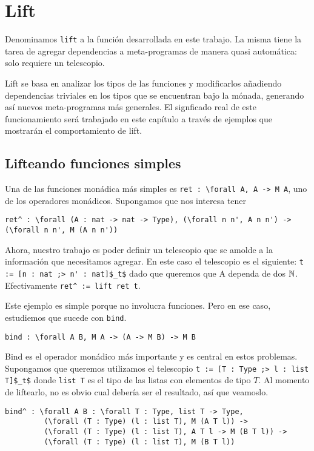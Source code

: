 \section{Lift}

Denominamos \lstinline{lift} a la función desarrollada en este trabajo.
La misma tiene la tarea de agregar dependencias a meta-programas de manera quasi automática: solo requiere un telescopio.

Lift se basa en analizar los tipos de las funciones y modificarlos añadiendo dependencias triviales en los tipos que se encuentran bajo la mónada, generando así nuevos meta-programas más generales.
El signficado real de este funcionamiento será trabajado en este capítulo a través de ejemplos que mostrarán el comportamiento de lift.

\subsection[]{Lifteando funciones simples}

Una de las funciones monádica más simples es \lstinline{ret : \forall A, A -> M A}, uno de los operadores monádicos.
Supongamos que nos interesa tener
\begin{lstlisting}
ret^ : \forall (A : nat -> nat -> Type), (\forall n n', A n n') -> (\forall n n', M (A n n'))
\end{lstlisting}

Ahora, nuestro trabajo es poder definir un telescopio que se amolde a la información que necesitamos agregar.
En este caso el telescopio es el siguiente: \lstinline{t := [n : nat ;> n' : nat]$_t$} dado que queremos que \lstinline{}{A} dependa de dos $\mathbb{N}$. Efectivamente \lstinline{ret^ := lift ret t}.

Este ejemplo es simple porque no involucra funciones. Pero en ese caso, estudiemos que sucede con \lstinline{bind}.
\begin{lstlisting}
bind : \forall A B, M A -> (A -> M B) -> M B
\end{lstlisting}

Bind es el operador monádico más importante y es central en estos problemas.
Supongamos que queremos utilizamos el telescopio \lstinline{t := [T : Type ;> l : list T]$_t$} donde \lstinline{list T} es el tipo de las listas con elementos de tipo $T$.
Al momento de liftearlo, no es obvio cual debería ser el resultado, así que veamoslo.

\begin{lstlisting}
bind^ : \forall A B : \forall T : Type, list T -> Type,
         (\forall (T : Type) (l : list T), M (A T l)) ->
         (\forall (T : Type) (l : list T), A T l -> M (B T l)) ->
         (\forall (T : Type) (l : list T), M (B T l))
\end{lstlisting}

